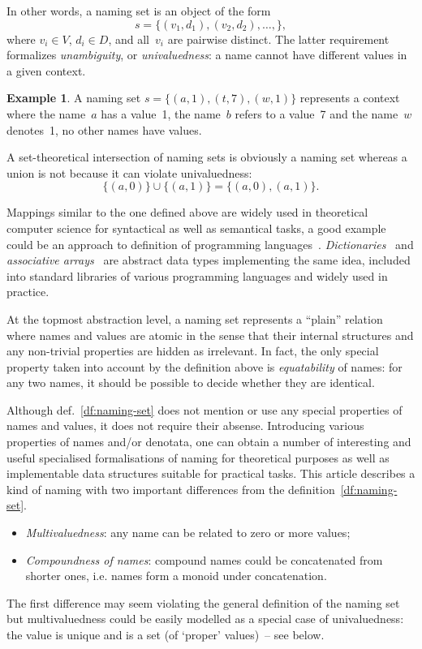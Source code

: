 \documentclass{article}
\theoremstyle{definition}
\newtheorem{Ex}{Example}
\begin{document}
In other words, a naming set is an object of the form
\[
  s = \{ (v_1, d_1), (v_2, d_2), \ldots, \} ,
\]
where $v_i\in V$, $d_i\in D$, and all~$v_i$ are pairwise distinct. The
latter requirement formalizes \emph{unambiguity}, or \emph{univaluedness}: a
name cannot have different values in a given context.

\begin{Ex}\label{ex:naming-set}
A naming set $s = \{ (a, 1), (t, 7), (w, 1) \}$ represents a context where
the name~$a$ has a value~1, the name~$b$ refers to a value~7 and the name~$w$
denotes~1, no other names have values.
\end{Ex}

A set-theoretical intersection  of naming sets is obviously a naming set
whereas a union is not because it can violate univaluedness:
\[
  \{ (a, 0) \} \cup \{ (a, 1) \} = \{ (a, 0), (a, 1) \} .
\]

Mappings similar to the one defined above are widely used in theoretical
computer science for syntactical as well as semantical tasks, a good example
could be an approach to definition of programming
languages~\cite{bib:ollongren}.  \emph{Dictionaries}~\cite{bib:dictionary} and
\emph{associative arrays}~\cite{bib:mehlhorn-assoc} are abstract data types
implementing the same idea, included into standard libraries of various
programming languages and widely used in practice.

At the topmost abstraction level, a naming set represents a ``plain'' relation
where names and values are atomic in the sense that their internal structures
and any non-trivial properties are hidden as irrelevant.  In fact, the only
special property taken into account by the definition above is
\emph{equatability} of names: for any two names, it should be possible to
decide whether they are identical.

Although def.~\ref{df:naming-set} does not mention or use any special properties
of names and values, it does not require their absense.
Introducing various properties of names and/or denotata, one can obtain a
number of interesting and useful specialised formalisations of naming for
theoretical purposes as well as implementable data structures suitable for
practical tasks. This article describes a kind of naming with
two important differences from the definition~\ref{df:naming-set}.
\begin{itemize}
\item \emph{Multivaluedness}: any name can be related to zero or more values;
\item \emph{Compoundness of names}: compound names could be concatenated from
shorter ones, i.e. names form a monoid under concatenation.
\end{itemize}
The first difference may seem violating the general definition of the
naming set but multivaluedness could be easily modelled as a special case of
univaluedness: the value is unique and is a set (of `proper' values)~-- see
below.
\end{document}
